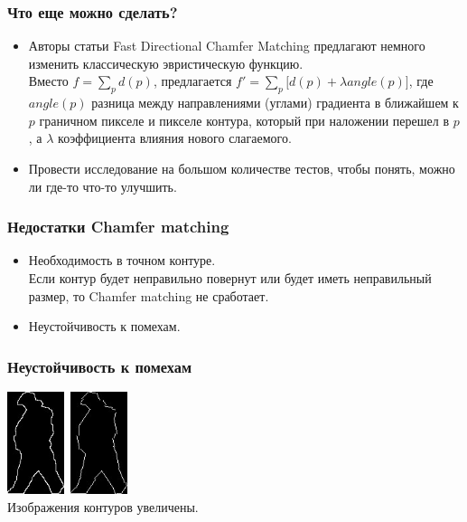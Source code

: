 \begin{frame}\frametitle{Что еще можно сделать?}
    \begin{itemize}
        \item Авторы статьи Fast Directional Chamfer Matching предлагают
        немного изменить классическую эвристическую функцию.\\
        Вместо $f = \sum\limits_{p}{d(p)}$, предлагается $f' = \sum\limits_{p}{\bigg[d(p) + \lambda angle(p)\bigg]}$,
        где $angle(p)$ разница между направлениями (углами) градиента в ближайшем к $p$ граничном пикселе
        и пикселе контура, который при наложении перешел в $p$, а $\lambda$ коэффициента влияния нового слагаемого.
        \pause
        \item Провести исследование на большом количестве тестов, чтобы понять, можно ли где-то что-то улучшить.
    \end{itemize}
\end{frame}

\begin{frame}\frametitle{Недостатки Chamfer matching}
    \begin{itemize}
        \item Необходимость в точном контуре.\\
        Если контур будет неправильно повернут или будет иметь
        неправильный размер, то Chamfer matching не сработает.
        \pause
        \item Неустойчивость к помехам.
    \end{itemize}
\end{frame}

\begin{frame}\frametitle{Неустойчивость к помехам}
    \begin{center}
        \includegraphics[height=3cm]{veselov_imgs/pattern2.jpg}\
        \includegraphics[height=3cm]{veselov_imgs/l_pttrn2.jpg}\\
        Изображения контуров увеличены.
    \end{center}
\end{frame}

